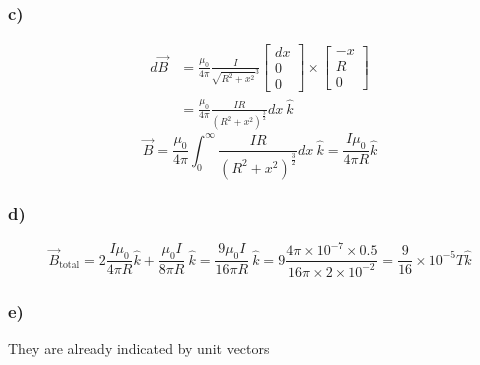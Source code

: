 \documentclass[../homework.tex]{subfiles}
\begin{document}
\subsubsection*{c)}
\begin{align*}
    d\vec{B} &= \frac{\mu_0}{4\pi}\frac{I}{\sqrt{R^2 + x^2}^3}
    \begin{bmatrix}
        dx \\
        0  \\
        0
    \end{bmatrix} \times
    \begin{bmatrix}
        -x \\
        R  \\
        0
    \end{bmatrix} \\
    &= \frac{\mu_0}{4\pi}\frac{IR}{(R^2 + x^2)^\frac{3}{2}} dx~\hat{k}
\end{align*}
\begin{equation*}
    \vec{B} = \frac{\mu_0}{4\pi}\int_{0}^{\infty} \frac{IR}{(R^2 + x^2)^\frac{3}{2}} dx~\hat{k} = \frac{I\mu_0}{4\pi R}\hat{k}
\end{equation*}

\subsubsection*{d)}
\begin{equation*}
    \vec{B}_{\text{total}} = 2\frac{I\mu_0}{4\pi R}\hat{k} + \frac{\mu_0I}{8\pi R}~\hat{k} = \frac{9\mu_0I}{16\pi R}~\hat{k} = 9 \frac{4\pi \times 10^{-7} \times 0.5}{16 \pi \times 2 \times 10^{-2}} = \frac{9}{16} \times 10^{-5}  T \hat{k}
\end{equation*}

\subsubsection*{e)}\indent\indent
They are already indicated by unit vectors
\end{document}
